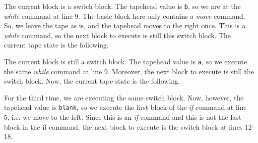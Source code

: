 \noindent The current block is a switch block. The tapehead value is \texttt{b}, so we are at the \textit{while} command at line 9. The basic block here only contains a \textit{move} command. So, we leave the tape as is, and the tapehead moves to the right once. This is a \textit{while} command, so the next block to execute is still this switch block. The current tape state is the following.
\begin{figure}[H]
    \centering
\end{figure}
\noindent The current block is still a switch block. The tapehead value is \texttt{a}, so we execute the same \textit{while} command at line 9. Moreover, the next block to execute is still the switch block. Now, the current tape state is the following.
\begin{figure}[H]
    \centering
\end{figure}
\noindent For the third time, we are executing the same switch block. Now, however, the tapehead value is \texttt{blank}, so we execute the first block of the \textit{if} command at line 5, i.e. we move to the left. Since this is an \textit{if} command and this is not the last block in the if command, the next block to execute is the switch block at lines 12-18.
\begin{figure}[H]
    \centering
\end{figure}
